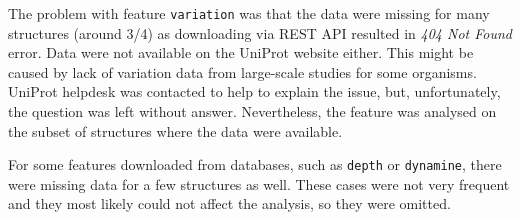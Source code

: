 The problem with feature \texttt{variation} was that the data were missing for many structures (around 3/4) as downloading via REST API resulted in \textit{404 Not Found} error. Data were not available on the UniProt website either. This might be caused by lack of variation data from large-scale studies for some organisms. UniProt helpdesk was contacted to help to explain the issue, but, unfortunately, the question was left without answer. Nevertheless, the feature was analysed on the subset of structures where the data were available.

For some features downloaded from databases, such as \texttt{depth} or \texttt{dynamine}, there were missing data for a few structures as well. These cases were not very frequent and they most likely could not affect the analysis, so they were omitted.


